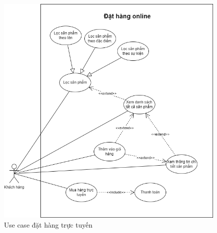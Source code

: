 \begin{figure}[!htp]
    \centering
    \includegraphics[width=12cm]{img/UseCase/UseCase-Đặt hàng.drawio.png}
    \newline
    \caption{Use case đặt hàng trực tuyến}
\end{figure}

